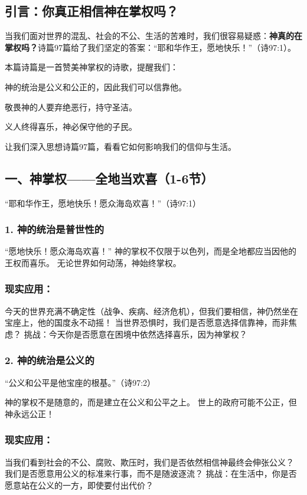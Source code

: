 \documentclass[a4paper, 12pt]{article}
\begin{document}
\subsection*{引言：你真正相信神在掌权吗？}
\hspace{0.6cm}当我们面对世界的混乱、社会的不公、生活的苦难时，我们很容易疑惑：\textbf{神真的在掌权吗？}诗篇97篇给了我们坚定的答案：“耶和华作王，愿地快乐！”（诗97:1）。

本篇诗篇是一首赞美神掌权的诗歌，提醒我们：

神的统治是公义和公正的，因此我们可以信靠他。

敬畏神的人要弃绝恶行，持守圣洁。

义人终得喜乐，神必保守他的子民。

让我们深入思想诗篇97篇，看看它如何影响我们的信仰与生活。

\subsection*{一、神掌权——全地当欢喜（1-6节）}
“耶和华作王，愿地快乐！愿众海岛欢喜！”（诗97:1）

\subsubsection*{1. 神的统治是普世性的}
“愿地快乐！愿众海岛欢喜！”
神的掌权不仅限于以色列，而是全地都应当因他的王权而喜乐。
无论世界如何动荡，神始终掌权。
\subsubsection*{现实应用：}

今天的世界充满不确定性（战争、疾病、经济危机），但我们要相信，神仍然坐在宝座上，他的国度永不动摇！
当世界恐惧时，我们是否愿意选择信靠神，而非焦虑？
挑战：今天你是否愿意在困境中依然选择喜乐，因为神掌权？

\subsubsection*{2. 神的统治是公义的}
“公义和公平是他宝座的根基。”（诗97:2）

神的掌权不是随意的，而是建立在公义和公平之上。
世上的政府可能不公正，但神永远公正！
\subsubsection*{现实应用：}

当我们看到社会的不公、腐败、欺压时，我们是否依然相信神最终会伸张公义？
我们是否愿意用公义的标准来行事，而不是随波逐流？
挑战：在生活中，你是否愿意站在公义的一方，即使要付出代价？
\end{document}
